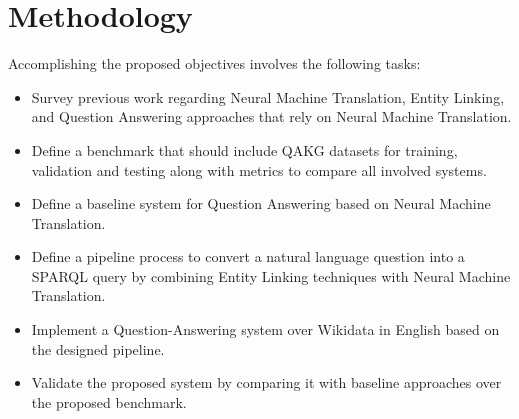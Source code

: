 \section*{Methodology}
Accomplishing the proposed objectives involves the following tasks:
\begin{itemize}
    \item Survey previous work regarding Neural Machine Translation, Entity Linking, and 
    Question Answering approaches that rely on Neural Machine Translation.
    \item Define a benchmark that should include QAKG datasets for training, validation and 
    testing along with metrics to compare all involved systems.
    \item Define a baseline system for Question Answering based on Neural Machine Translation.
    \item Define a pipeline process to convert a natural language question into a SPARQL query 
    by combining Entity Linking techniques with Neural Machine Translation.
    \item Implement a Question-Answering system over Wikidata in English based on the designed pipeline.
    \item Validate the proposed system by comparing it with baseline approaches over the 
    proposed benchmark.
\end{itemize}
